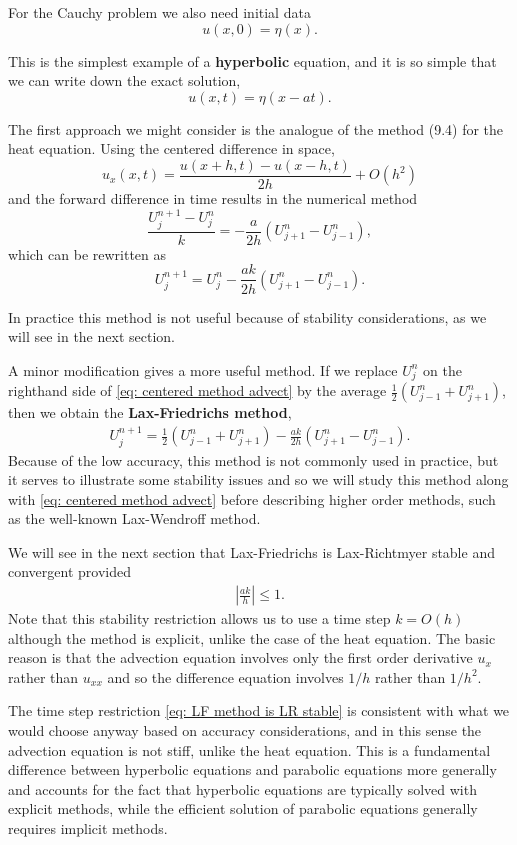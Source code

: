 For the Cauchy problem we also need initial data
$$
u(x, 0)=\eta(x) .
$$

This is the simplest example of a \textbf{hyperbolic} equation, and it is so simple that we can write down the exact solution,
$$
u(x, t)=\eta(x-a t) .
$$

The first approach we might consider is the analogue of the method (9.4) for the heat equation. Using the centered difference in space,
$$
u_x(x, t)=\frac{u(x+h, t)-u(x-h, t)}{2 h}+O\left(h^2\right)
$$
and the forward difference in time results in the numerical method
$$
\frac{U_j^{n+1}-U_j^n}{k}=-\frac{a}{2 h}\left(U_{j+1}^n-U_{j-1}^n\right),
$$
which can be rewritten as
\begin{equation}
\label{eq: centered method advect}
    U_j^{n+1}=U_j^n-\frac{a k}{2 h}\left(U_{j+1}^n-U_{j-1}^n\right) .
\end{equation}

In practice this method is not useful because of stability considerations, as we will see in the next section.

A minor modification gives a more useful method. If we replace $U_j^n$ on the righthand side of \eqref{eq: centered method advect} by the average $\frac{1}{2}\left(U_{j-1}^n+U_{j+1}^n\right)$, then we obtain the \textbf{Lax-Friedrichs method},
\begin{align}
    \label{eq: Lax-Friedrichs method advect}
U_j^{n+1}=\frac{1}{2}\left(U_{j-1}^n+U_{j+1}^n\right)-\frac{a k}{2 h}\left(U_{j+1}^n-U_{j-1}^n\right) .
\end{align}
Because of the low accuracy, this method is not commonly used in practice, but it serves to illustrate some stability issues and so we will study this method along with \eqref{eq: centered method advect} before describing higher order methods, such as the well-known Lax-Wendroff method.

We will see in the next section that Lax-Friedrichs is Lax-Richtmyer stable and convergent provided
\begin{align}
    \label{eq: LF method is LR stable}
\left|\frac{a k}{h}\right| \leq 1 .
\end{align}
Note that this stability restriction allows us to use a time step $k=O(h)$ although the method is explicit, unlike the case of the heat equation. The basic reason is that the advection equation involves only the first order derivative $u_x$ rather than $u_{x x}$ and so the difference equation involves $1 / h$ rather than $1 / h^2$.

The time step restriction \eqref{eq: LF method is LR stable}  is consistent with what we would choose anyway based on accuracy considerations, and in this sense the advection equation is not stiff, unlike the heat equation. This is a fundamental difference between hyperbolic equations and parabolic equations more generally and accounts for the fact that hyperbolic equations are typically solved with explicit methods, while the efficient solution of parabolic equations generally requires implicit methods.


